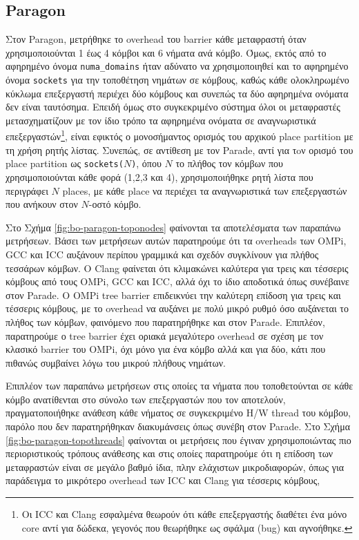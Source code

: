 \subsection{Paragon}
Στον Paragon, μετρήθηκε το overhead του barrier κάθε μεταφραστή όταν χρησιμοποιούνται 1 έως 4 κόμβοι και 6 νήματα ανά κόμβο. Όμως, εκτός από το αφηρημένο όνομα \texttt{numa\_domains} ήταν αδύνατο να χρησιμοποιηθεί και το αφηρημένο όνομα \texttt{sockets} για την τοποθέτηση νημάτων σε κόμβους, καθώς κάθε ολοκληρωμένο κύκλωμα επεξεργαστή περιέχει δύο κόμβους και συνεπώς τα δύο αφηρημένα ονόματα δεν είναι ταυτόσημα. Επειδή όμως στο συγκεκριμένο σύστημα όλοι οι μεταφραστές μετασχηματίζουν με τον ίδιο τρόπο τα αφηρημένα ονόματα σε αναγνωριστικά επεξεργαστών\footnote{Οι ICC και Clang εσφαλμένα θεωρούν ότι κάθε επεξεργαστής διαθέτει ένα μόνο core αντί για δώδεκα, γεγονός που θεωρήθηκε ως σφάλμα (bug) και αγνοήθηκε.}, είναι εφικτός ο μονοσήμαντος ορισμός του αρχικού place partition με τη χρήση ρητής λίστας. Συνεπώς, σε αντίθεση με τον Parade, αντί για τoν ορισμό του place partition ως \texttt{sockets($N$)}, όπου $N$ το πλήθος τον κόμβων που χρησιμοποιούνται κάθε φορά (1,2,3 και 4), χρησιμοποιήθηκε ρητή λίστα που περιγράφει $N$ places, με κάθε place να περιέχει τα αναγνωριστικά των επεξεργαστών που ανήκουν στον $N$-οστό κόμβο.

Στο Σχήμα \ref{fig:bo-paragon-toponodes} φαίνονται τα αποτελέσματα των παραπάνω μετρήσεων. Βάσει των μετρήσεων αυτών παρατηρούμε ότι τα overheads των OMPi, GCC και ICC αυξάνουν περίπου γραμμικά και σχεδόν συγκλίνουν για πλήθος τεσσάρων κόμβων. Ο Clang φαίνεται ότι κλιμακώνει καλύτερα για τρεις και τέσσερις κόμβους από τους OMPi, GCC και ICC, αλλά όχι το ίδιο αποδοτικά όπως συνέβαινε στον Parade. Ο OMPi tree barrier επιδεικνύει την καλύτερη επίδοση για τρεις και τέσσερις κόμβους, με το overhead να αυξάνει με πολύ μικρό ρυθμό όσο αυξάνεται το πλήθος των κόμβων, φαινόμενο που παρατηρήθηκε και στον Parade. Επιπλέον, παρατηρούμε ο tree barrier έχει οριακά μεγαλύτερο overhead σε σχέση με τον κλασικό barrier του OMPi, όχι μόνο για ένα κόμβο αλλά και για δύο, κάτι που πιθανώς συμβαίνει λόγω του μικρού πλήθους νημάτων.

Επιπλέον των παραπάνω μετρήσεων στις οποίες τα νήματα που τοποθετούνται σε κάθε κόμβο ανατίθενται στο σύνολο των επεξεργαστών που τον αποτελούν, πραγματοποιήθηκε ανάθεση κάθε νήματος σε συγκεκριμένο H/W thread του κόμβου, παρόλο που δεν παρατηρήθηκαν διακυμάνσεις όπως συνέβη στον Parade. Στο Σχήμα \ref{fig:bo-paragon-topothreads} φαίνονται οι μετρήσεις που έγιναν χρησιμοποιώντας πιο περιοριστικούς τρόπους ανάθεσης και στις οποίες παρατηρούμε ότι η επίδοση των μεταφραστών είναι σε μεγάλο βαθμό ίδια, πλην ελάχιστων μικροδιαφορών, όπως για παράδειγμα το μικρότερο overhead των ICC και Clang για τέσσερις κόμβους,
 
